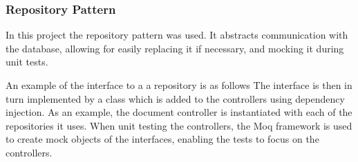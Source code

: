 \subsubsection{Repository Pattern}
In this project the repository pattern was used.
It abstracts communication with the database, allowing for easily replacing it if necessary, and mocking it during unit tests.

An example of the interface to a a repository is as follows
The interface is then in turn implemented by a class which is added to the controllers using dependency injection.
As an example, the document controller is instantiated with each of the repositories it uses.
When unit testing the controllers, the Moq framework is used to create mock objects of the interfaces, enabling the tests to focus on the controllers.
